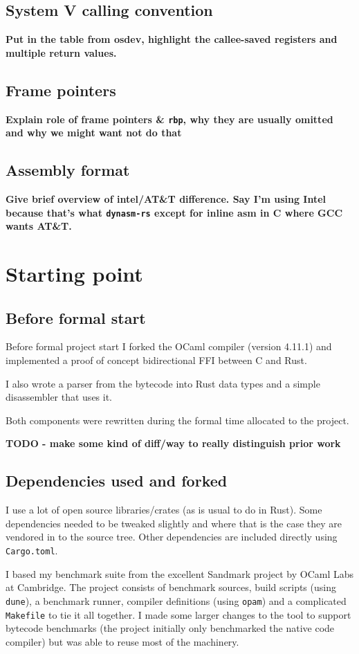 \subsection{System V calling convention}

\textbf{Put in the table from osdev, highlight the callee-saved registers and multiple return
    values.}

\subsection{Frame pointers}

\textbf{Explain role of frame pointers \& \texttt{rbp}, why they are usually omitted and why we
    might want
    not do that}

\subsection{Assembly format}

\textbf{Give brief overview of intel/AT\&T difference. Say I'm using Intel because that's what
    \texttt{dynasm-rs} except for inline asm in C where GCC wants AT\&T.}

\section{Starting point}

\subsection{Before formal start}

Before formal project start I forked the OCaml compiler (version 4.11.1) and implemented a proof
of concept bidirectional FFI between C and Rust.

I also wrote a parser from the bytecode into Rust data types and a simple disassembler that uses
it.

Both components were rewritten during the formal time allocated to the project.

\textbf{TODO - make some kind of diff/way to really distinguish prior work}

\subsection{Dependencies used and forked}

I use a lot of open source libraries/crates (as is usual to do in Rust). Some dependencies needed
to
be tweaked slightly and where that is the case they are vendored in to the source tree. Other
dependencies are included directly using \texttt{Cargo.toml}.

I based my benchmark suite from the excellent Sandmark project by OCaml Labs at Cambridge. The
project consists of benchmark sources, build scripts (using \texttt{dune}), a benchmark runner,
compiler definitions (using \texttt{opam}) and a complicated \texttt{Makefile} to tie it all
together.  I made some larger changes to the tool to support bytecode benchmarks (the project
initially only benchmarked the native code compiler) but was able to reuse most of the machinery.

